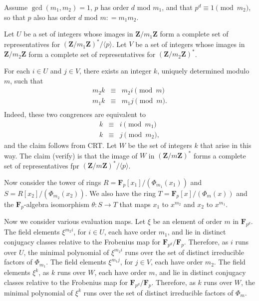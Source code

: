 \documentclass[11pt]{article}
\newcommand{\FF}{\mathbf{F}}
\newcommand{\ZZ}{\mathbf{Z}}
\newcommand{\deq}{\mathrel{\mathop:}=}
\begin{document}
\sloppy

Assume $\gcd(m_1, m_2) = 1$, $p$ has order $d$ mod $m_1$,
and that $p^d \equiv 1 \pmod{m_2}$, so that $p$ also 
has order $d$ mod $m \deq m_1 m_2$.

Let $U$ be a set of integers whose images in $\ZZ/m_1\ZZ$
form a complete set of representatives for $(\ZZ/m_1\ZZ)^*/\langle p \rangle$.
Let $V$ be a set of integers whose images in $\ZZ/m_2\ZZ$
form a complete set of representatives for $(\ZZ/m_2\ZZ)^*$.

For each $i \in U$ and $j \in V$, there exists an integer $k$,
uniquely determined modulo $m$, such that 
\begin{equation}
\label{eq1}
\begin{array}{rcl}
m_2 k & \equiv & m_2 i \pmod{m} \\
m_1 k & \equiv & m_1 j \pmod{m} . \\
\end{array}
\end{equation}
Indeed, these two congrences are equivalent to
\begin{eqnarray*}
k & \equiv & i \pmod{m_1} \\
k & \equiv & j \pmod{m_2},
\end{eqnarray*}
and the claim follows from CRT.
Let $W$ be the set of integers $k$ that arise in this way.
The claim (verify) is that the image of $W$ in $(\ZZ/m\ZZ)^*$
forms a complete set of representatives fpr $(\ZZ/m\ZZ)^*/\langle p \rangle$.



Now consider the tower of rings $R = \FF_p[x_1]/(\Phi_{m_1}(x_1))$
and $S = R[x_2]/(\Phi_{m_2}(x_2))$.
We also have the ring $T = \FF_p[x]/(\Phi_m(x))$ and the $\FF_p$-algebra
isomorphism $\theta : S \rightarrow T$ that maps $x_1$ to $x^{m_2}$ and
$x_2$ to $x^{m_1}$.

Now we consider various evaluation maps.
Let $\xi$ be an element of order $m$ in $\FF_{p^d}$. 
The field elements $\xi^{m_2 i}$, for $i \in U$, each have order $m_1$,
and lie in distinct conjugacy classes relative to the Frobenius map
for $\FF_{p^d}/\FF_p$.
Therefore, as $i$ runs over $U$, the minimal polynomial of 
$\xi^{m_2 i}$ runs over the set of distinct irreducible factors
of $\Phi_{m_1}$.
The field elements $\xi^{m_1 j}$, for $j \in V$,
each have order $m_2$.
The field elements $\xi^k$, as $k$ runs over $W$,
each have order $m$, and lie in distinct conjugacy classes
relative to the Frobenius map for  $\FF_{p^d}/\FF_p$.
Therefore, as $k$ runs over $W$, the minimal polynomial of
$\xi^k$ runs over the set of distinct irreducible factors
of $\Phi_m$.
\end{document}
